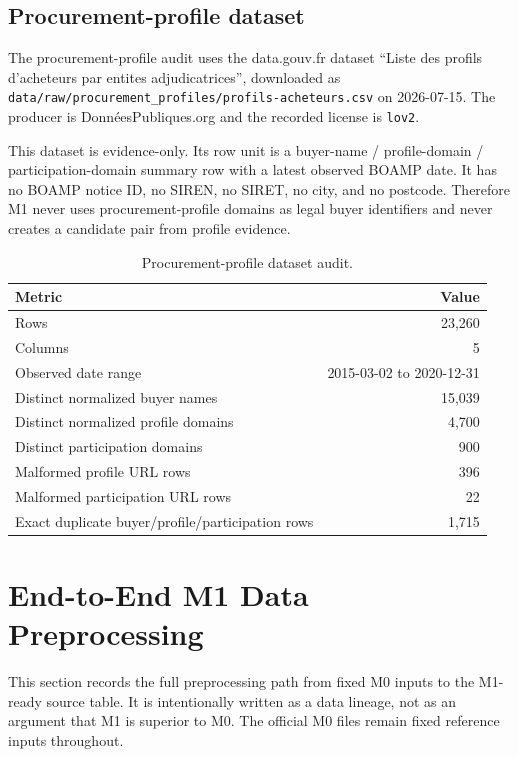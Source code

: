 \documentclass[11pt]{article}
\begin{document}
\subsection{Procurement-profile dataset}

The procurement-profile audit uses the data.gouv.fr dataset ``Liste des
profils d'acheteurs par entites adjudicatrices'', downloaded as
\texttt{data/raw/procurement\_profiles/profils-acheteurs.csv} on
2026-07-15. The producer is Donn\'eesPubliques.org and the recorded
license is \texttt{lov2}.

This dataset is evidence-only. Its row unit is a buyer-name /
profile-domain / participation-domain summary row with a latest observed
BOAMP date. It has no BOAMP notice ID, no SIREN, no SIRET, no city, and no
postcode. Therefore M1 never uses procurement-profile domains as legal
buyer identifiers and never creates a candidate pair from profile evidence.

\begin{table}[h]
\centering
\caption{Procurement-profile dataset audit.}
\begin{tabular}{lr}
\toprule
Metric & Value\\
\midrule
Rows & 23,260\\
Columns & 5\\
Observed date range & 2015-03-02 to 2020-12-31\\
Distinct normalized buyer names & 15,039\\
Distinct normalized profile domains & 4,700\\
Distinct participation domains & 900\\
Malformed profile URL rows & 396\\
Malformed participation URL rows & 22\\
Exact duplicate buyer/profile/participation rows & 1,715\\
\bottomrule
\end{tabular}
\end{table}

\section{End-to-End M1 Data Preprocessing}
\label{sec:m1-end-to-end-preprocessing}

This section records the full preprocessing path from fixed M0 inputs to
the M1-ready source table. It is intentionally written as a data lineage,
not as an argument that M1 is superior to M0. The official M0 files remain
fixed reference inputs throughout.
\end{document}
